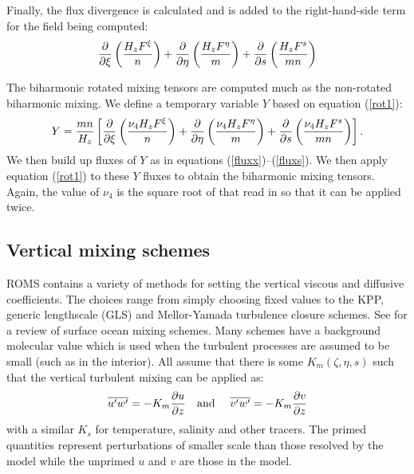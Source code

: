 Finally, the flux divergence is calculated and is added to the
right-hand-side term for the field being computed:
\begin{equation}
  {\partial \over \partial \xi} \left( { H_z F^\xi \over n} \right) +
  {\partial \over \partial \eta} \left( { H_z F^\eta \over m} \right) +
  {\partial \over \partial s}
  \left( { H_z F^s \over mn} \right)
\label{rot1}
\end{equation}

The biharmonic rotated mixing tensors are computed much as the
non-rotated biharmonic mixing.  We define a temporary variable $Y$
based on equation (\ref{rot1}):
\begin{equation}
  Y = {mn \over H_z} \left[
  {\partial \over \partial \xi} \left( {\nu_4 H_z F^\xi \over n} \right) +
  {\partial \over \partial \eta} \left( {\nu_4 H_z F^\eta \over m} \right) +
  {\partial \over \partial s}
  \left( {\nu_4 H_z F^s \over mn} \right)
  \right] .
\end{equation}
We then build up fluxes of $Y$ as in equations
(\ref{fluxx})--(\ref{fluxs}).  We then apply equation (\ref{rot1})
to these $Y$ fluxes to obtain the biharmonic mixing tensors. Again, the
value of $\nu_4$ is the square root of that read in so that it can be
applied twice.

\subsection{Vertical mixing schemes}
\label{Vmix}
ROMS contains a variety of methods for setting the vertical viscous and
diffusive coefficients. The choices range from simply choosing fixed
values to the KPP, generic lengthscale (GLS) and Mellor-Yamada turbulence
closure schemes.  See \citet{Large98} for a review of surface ocean
mixing schemes.  Many schemes have a background molecular value which
is used when the turbulent processes are assumed to be small (such as
in the interior). All assume that there is some $K_m(\zeta,\eta,s)$
such that the vertical turbulent mixing can be applied as:
\begin{equation}
    \overline{u' w'} = -K_m {\partial u \over \partial z}
    \mbox{\quad and \quad}
    \overline{v' w'} = -K_m {\partial v \over \partial z}
\end{equation}
with a similar $K_s$ for temperature, salinity and other tracers. The
primed quantities represent perturbations of smaller scale than those
resolved by the model while the unprimed $u$ and $v$ are those in
the model.

